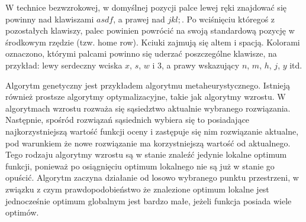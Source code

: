 \documentclass{xmgr}
\begin{document}
W technice bezwzrokowej, w domyślnej pozycji palce lewej ręki znajdować się powinny nad klawiszami $asdf$, a prawej nad $jkl;$. Po wciśnięciu któregoś z pozostałych klawiszy, palec powinien powrócić na swoją standardową pozycję w środkowym rzędzie (tzw. home row). Kciuki zajmują się altem i spacją. Kolorami oznaczono, którymi palcami powinno się uderzać poszczególne klawisze, na przykład: lewy serdeczny wciska $x$, $s$, $w$ i $3$, a prawy wskazujący $n$, $m$, $h$, $j$, $y$ itd.

Algorytm genetyczny jest przykładem algorytmu metaheurystycznego. Istnieją również prostsze algorytmy optymalizacyjne, takie jak algorytmy wzrostu. W algorytmach wzrostu rozważa się sąsiedztwo aktualnie wybranego rozwiązania. Następnie, spośród rozwiązań sąsiednich wybiera się to posiadające najkorzystniejszą wartość funkcji oceny i zastępuje się nim rozwiązanie aktualne, pod warunkiem że nowe rozwiązanie ma korzystniejszą wartość od aktualnego. Tego rodzaju algorytmy wzrostu są w stanie znaleźć jedynie lokalne optimum funkcji, ponieważ po osiągnięciu optimum lokalnego nie są już w stanie go opuścić. Algorytm zaczyna działanie od losowo wybranego punktu przestrzeni, w związku z czym prawdopodobieństwo że znalezione optimum lokalne jest jednocześnie optimum globalnym jest bardzo małe, jeżeli funkcja posiada wiele optimów.
\end{document}
